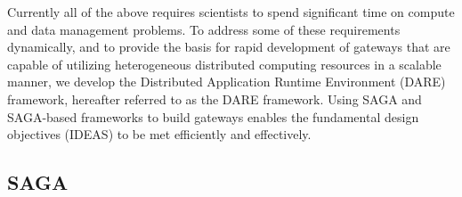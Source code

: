 \documentclass[]{svjour3}
\begin{document}
 Currently all of the above requires scientists to
spend significant time on compute and data management problems.  To
address some of these requirements dynamically, and to provide the
basis for rapid development of gateways that are capable of utilizing
heterogeneous distributed computing resources in a scalable manner, we
develop the Distributed Application Runtime Environment (DARE)
framework\cite{dareurl}, hereafter referred to as the DARE
framework. Using SAGA and SAGA-based frameworks to build gateways
enables the fundamental design objectives (IDEAS) to be met
efficiently and effectively.




\subsection{SAGA}

\end{document}
